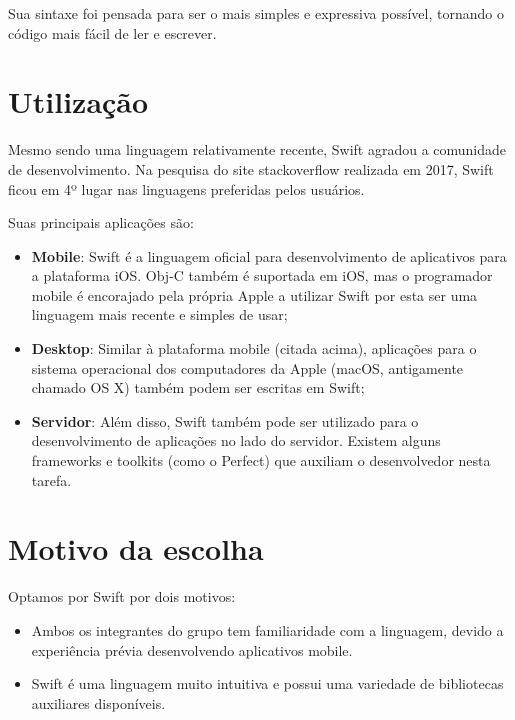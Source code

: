 \documentclass[rel_mlp]{iiufrgs}
\begin{document}
Sua sintaxe foi pensada para ser o mais simples e expressiva possível, tornando o código mais fácil de ler e escrever.


\section{Utilização}

Mesmo sendo uma linguagem relativamente recente, Swift agradou a comunidade de desenvolvimento. Na pesquisa do site stackoverflow realizada em 2017, Swift ficou em 4º lugar nas linguagens preferidas pelos usuários.

Suas principais aplicações são:

\begin{itemize}[leftmargin=3em] %
\setlength{\itemindent}{1em}

    \item \textbf{Mobile}: Swift é a linguagem oficial para desenvolvimento de aplicativos para a plataforma iOS. Obj-C também é suportada em iOS, mas o programador mobile é encorajado pela própria Apple a utilizar Swift por esta ser uma linguagem mais recente e simples de usar;

    \item \textbf{Desktop}: Similar à plataforma mobile (citada acima), aplicações para o sistema operacional dos computadores da Apple (macOS, antigamente chamado OS X) também podem ser escritas em Swift;

    \item \textbf{Servidor}: Além disso, Swift também pode ser utilizado para o desenvolvimento de aplicações no lado do servidor. Existem alguns frameworks e toolkits (como o Perfect) que auxiliam o desenvolvedor nesta tarefa.

\end{itemize}

\section{Motivo da escolha}

Optamos por Swift por dois motivos:

\begin{itemize}[leftmargin=3em]
\setlength{\itemindent}{1em}

    \item Ambos os integrantes do grupo tem familiaridade com a linguagem, devido a experiência prévia desenvolvendo aplicativos mobile.

    \item Swift é uma linguagem muito intuitiva e possui uma variedade de bibliotecas auxiliares disponíveis.

\end{itemize}
\end{document}
